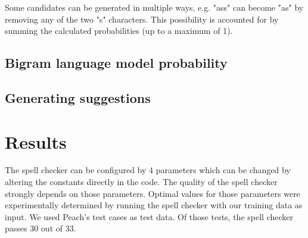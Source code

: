 \documentclass[11pt,a4paper]{article}
\begin{document}
Some candidates can be generated in multiple ways, e.g. "ass" can become "as" by removing any of the two "s" characters.
This possibility is accounted for by summing the calculated probabilities (up to a maximum of 1).

\subsection{Bigram language model probability}
\subsection{Generating suggestions}

\section{Results}
The spell checker can be configured by 4 parameters which can be changed by altering the constants directly in the code. The quality of the spell checker strongly depends on those parameters. Optimal values for those parameters were experimentally determined by running the spell checker with our training data as input. We used Peach's test cases as test data. Of those tests, the spell checker passes 30 out of 33.
\end{document}
